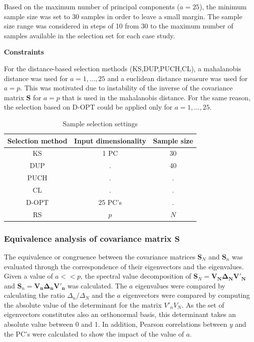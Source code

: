 \documentclass[journal=ancham,manuscript=article]{achemso}
\begin{document}
Based on the maximum number of principal components ($a=25$), the minimum sample size was set to 30 samples in order to leave a small margin. The sample size range was considered in steps of 10 from 30 to the maximum number of samples available in the selection set for each case study. 

\textbf{Constraints}

For the distance-based selection methods (KS,DUP,PUCH,CL), a mahalanobis distance was used for $a=1,...,25$ and a euclidean distance measure was used for $a=p$. This was motivated due to instability of the inverse of the covariance matrix $\mathbf{S}$ for $a=p$ that is used in the mahalanobis distance. For the same reason, the selection based on D-OPT could be applied only for $a=1,...,25$. 

\begin{table}[t]
\centering
\begin{tabular}{|c|c|c|} 
\hline
Selection method	& Input dimensionality	& Sample size	\\
\hline

KS & 1 PC   & 30  \\
DUP &  . & 40\\
PUCH &  . & . \\
CL & . & . \\
D-OPT & 25 PC's & .\\
RS & $p$ & $N$\\
\hline


\end{tabular}
\caption{Sample selection settings}
\label{tab_samplesel_settings_exhaustive_search}
\end{table}

\subsubsection{Equivalence analysis of covariance matrix $\mathbf{S}$}

The equivalence or congruence between the covariance matrices $\mathbf{S}_N$ and $\mathbf{S}_n$ was evaluated through the correspondence of their eigenvectors and the eigenvalues. Given a value of $a<<p$, the spectral value decomposition of $\mathbf{S}_N = \mathbf{V_N \Delta_N V'_N}$ and $\mathbf{S}_n = \mathbf{V_n \Delta_n V'_n}$ was calculated. The $a$ eigenvalues were compared by calculating the ratio  $\Delta_n/\Delta_N$ and the $a$ eigenvectors were compared by computing the absolute value of the determinant for the matrix $V'_nV_N$. As the set of eigenvectors constitutes also an orthonormal basis, this determinant takes an absolute value between 0 and 1. In addition, Pearson correlations between $y$ and the PC's were calculated to show the impact of the value of $a$.
\end{document}
